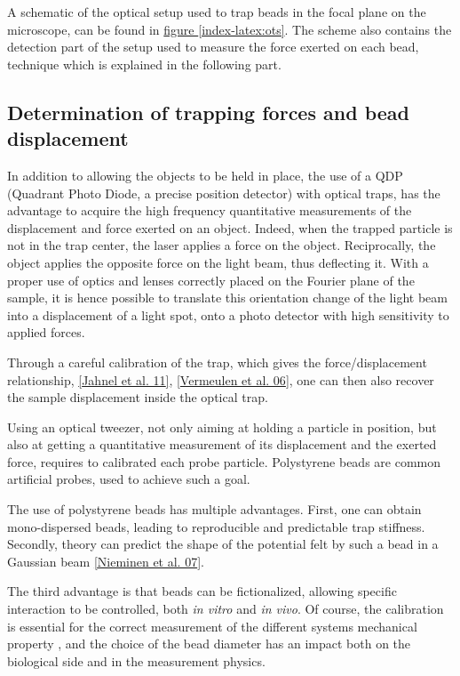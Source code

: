 \documentclass[A4paperpaper,11pt,english]{sphinxmanual}
\begin{document}
A schematic of the optical setup used to trap beads in the focal
plane on the microscope, can be found in \hyperref[index-latex:ots]{figure  \ref*{index-latex:ots}}. The scheme also
contains the detection part of the setup used to measure the force
exerted on each bead, technique which is explained in the following part.


\subsection{Determination of trapping forces and bead displacement}
\label{index-latex:determination-of-trapping-forces-and-bead-displacement}
In addition to allowing the objects to be held in place, the use of a QDP
(Quadrant Photo Diode, a precise position detector) with optical traps, has the
advantage to acquire the high frequency quantitative measurements of the
displacement and force exerted on an object.  Indeed, when the trapped particle
is not in the trap center, the laser applies a force on the object.
Reciprocally, the object applies the opposite force on the light beam, thus
deflecting it.  With a proper use of optics and lenses correctly placed on the
Fourier plane of the sample, it is hence possible to translate this orientation
change of the light  beam into a displacement of a light spot, onto a photo
detector with high sensitivity to applied forces.

Through a careful calibration of the trap, which gives the force/displacement
relationship, {\hyperref[index-latex:jahnel2011]{{[}Jahnel et al. 11{]}}}, {\hyperref[index-latex:vermeulen2006]{{[}Vermeulen et al. 06{]}}}, one can then also
recover the sample displacement inside the optical trap.

Using an optical tweezer, not only aiming at holding a particle in position, but also at getting a
quantitative measurement of its displacement and the exerted force, requires to
calibrated each probe particle. Polystyrene beads are common artificial probes,
used to achieve such a goal.

The use of polystyrene beads has multiple advantages. First, one
can obtain mono-dispersed beads, leading to reproducible and predictable trap
stiffness. Secondly, theory can predict the shape of
the potential felt by such a bead in a Gaussian beam {\hyperref[index-latex:nieminen2007]{{[}Nieminen et al. 07{]}}}.

The third advantage is that beads can be fictionalized, allowing specific
interaction to be controlled, both \emph{in vitro} and \emph{in vivo}. Of course, the
calibration is essential for the correct measurement of the different systems mechanical property
, and the choice of the bead diameter has an impact both on
the biological side and in the measurement physics.
\label{index-latex:part2}
\end{document}
